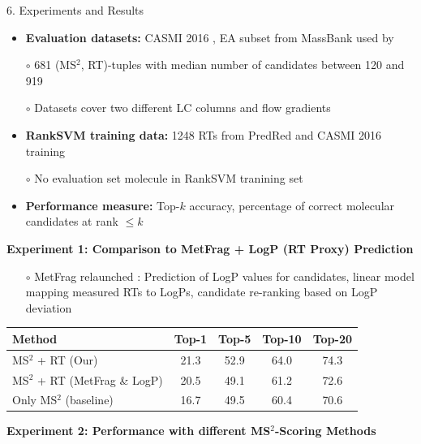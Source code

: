 \documentclass{beamer}
\newcommand{\ms}{MS}
\newcommand{\lc}{LC}
\newcommand{\msms}{\ms$^2$}
\begin{document}
\begin{frame}{}
\begin{columns}[T]
\hfill
{} 

    \begin{block}{{\normalsize 6. Experiments and Results}}
    \begin{itemize}
        \item \textbf{Evaluation datasets:} CASMI 2016 \cite{Schymanski2017}, EA subset from MassBank used by \cite{Ruttkies2016} 
        \item[$\circ$] 681 (\msms, RT)-tuples with median number of candidates between 120 and 919
        \item[$\circ$] Datasets cover two different \lc{} columns and flow gradients
        \item \textbf{RankSVM training data:} 1248 RTs from PredRed \cite{Stanstrup2015} and CASMI 2016 training
        \item[$\circ$] No evaluation set molecule in RankSVM tranining set
        \item \textbf{Performance measure:} Top-$k$ accuracy, percentage of correct molecular candidates at rank $\leq k$
    \end{itemize}
    \vspace{0.5cm}
    \textbf{Experiment 1: Comparison to MetFrag + LogP (RT Proxy) Prediction}
    \begin{itemize}
        \item[$\circ$] MetFrag relaunched \cite{Ruttkies2016}: Prediction of LogP values for candidates, linear model mapping measured RTs to LogPs, candidate re-ranking based on LogP deviation
    \end{itemize}
        \begin{table}
            \centering
            \begin{tabular}{lcccc}
                \toprule
                \textbf{Method} & \textbf{Top-1} & \textbf{Top-5} & \textbf{Top-10} & \textbf{Top-20} \\ \midrule
                \msms{} + RT (Our) & 21.3 & 52.9 & 64.0 & 74.3 \\
                \msms{} + RT (MetFrag \& LogP) & 20.5 & 49.1 & 61.2 & 72.6 \\ \cmidrule(lr){1-5}
                Only \msms{} (baseline) & 16.7 & 49.5 & 60.4 & 70.6 \\
                \bottomrule
            \end{tabular}
        \end{table}
    \vspace{1cm}
    \textbf{Experiment 2: Performance with different \msms{}-Scoring Methods}

\end{block}
\end{columns}
\end{frame}
\end{document}
